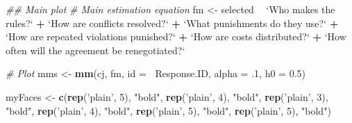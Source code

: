 \documentclass[12pt,a4paper,]{article}
\newenvironment{Shaded}{\begin{snugshade}}{\end{snugshade}}
\newcommand{\CommentTok}[1]{\textcolor[rgb]{0.56,0.35,0.01}{\textit{#1}}}
\newcommand{\DataTypeTok}[1]{\textcolor[rgb]{0.13,0.29,0.53}{#1}}
\newcommand{\DecValTok}[1]{\textcolor[rgb]{0.00,0.00,0.81}{#1}}
\newcommand{\FloatTok}[1]{\textcolor[rgb]{0.00,0.00,0.81}{#1}}
\newcommand{\KeywordTok}[1]{\textcolor[rgb]{0.13,0.29,0.53}{\textbf{#1}}}
\newcommand{\NormalTok}[1]{#1}
\newcommand{\OperatorTok}[1]{\textcolor[rgb]{0.81,0.36,0.00}{\textbf{#1}}}
\newcommand{\StringTok}[1]{\textcolor[rgb]{0.31,0.60,0.02}{#1}}
\begin{document}
\begin{Shaded}
\begin{Highlighting}[]
\CommentTok{## Main plot}
\CommentTok{# Main estimation equation}
\NormalTok{fm <-}\StringTok{ }\NormalTok{selected }\OperatorTok{~}\StringTok{ `}\DataTypeTok{Who makes the rules?}\StringTok{`} \OperatorTok{+}
\StringTok{  `}\DataTypeTok{How are conflicts resolved?}\StringTok{`} \OperatorTok{+}
\StringTok{  `}\DataTypeTok{What punishments do they use?}\StringTok{`} \OperatorTok{+}\StringTok{ }
\StringTok{  `}\DataTypeTok{How are repeated violations punished?}\StringTok{`} \OperatorTok{+}
\StringTok{  `}\DataTypeTok{How are costs distributed?}\StringTok{`} \OperatorTok{+}
\StringTok{  `}\DataTypeTok{How often will the agreement be renegotiated?}\StringTok{`}

\CommentTok{# Plot}
\NormalTok{mms <-}\StringTok{ }\KeywordTok{mm}\NormalTok{(cj, fm, }\DataTypeTok{id =} \OperatorTok{~}\NormalTok{Response.ID, }\DataTypeTok{alpha =} \FloatTok{.1}\NormalTok{, }\DataTypeTok{h0 =} \FloatTok{0.5}\NormalTok{)}

\NormalTok{myFaces <-}\StringTok{ }\KeywordTok{c}\NormalTok{(}\KeywordTok{rep}\NormalTok{(}\StringTok{'plain'}\NormalTok{, }\DecValTok{5}\NormalTok{), }\StringTok{"bold"}\NormalTok{,}
             \KeywordTok{rep}\NormalTok{(}\StringTok{'plain'}\NormalTok{, }\DecValTok{4}\NormalTok{), }\StringTok{"bold"}\NormalTok{,}
             \KeywordTok{rep}\NormalTok{(}\StringTok{'plain'}\NormalTok{, }\DecValTok{3}\NormalTok{), }\StringTok{"bold"}\NormalTok{,}
             \KeywordTok{rep}\NormalTok{(}\StringTok{'plain'}\NormalTok{, }\DecValTok{4}\NormalTok{), }\StringTok{"bold"}\NormalTok{,}
             \KeywordTok{rep}\NormalTok{(}\StringTok{'plain'}\NormalTok{, }\DecValTok{5}\NormalTok{), }\StringTok{"bold"}\NormalTok{,}
             \KeywordTok{rep}\NormalTok{(}\StringTok{'plain'}\NormalTok{, }\DecValTok{5}\NormalTok{), }\StringTok{"bold"}\NormalTok{)}


\end{Highlighting}
\end{Shaded}
\end{document}

